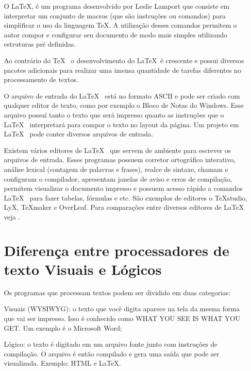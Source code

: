 O \LaTeX, é um programa desenvolvido por Leslie Lamport \cite{1994lamport} que consiste em interpretar um conjunto de macros (que são instruções ou comandos) para simplificar o uso da linguagem \TeX. A utilização desses comandos permitem o autor compor e configurar seu documento de modo mais simples utilizando estruturas pré definidas.

Ao contrário do \TeX~ o desenvolvimento do \LaTeX~é crescente e possui diversos pacotes adicionais para realizar uma imensa quantidade de tarefas diferentes no processamento de textos.

O arquivo de entrada do \LaTeX~ está no formato ASCII e pode ser criado com qualquer editor de texto, como por exemplo o Bloco de Notas do Windows. Esse arquivo possuí tanto o texto que será impresso quanto as instruções que o \LaTeX~ interpretará para compor o texto no layout da página. Um projeto em \LaTeX~ pode conter diversos arquivos de entrada.

Existem vários editores de \LaTeX~ que servem de ambiente para escrever os arquivos de entrada. Esses programas possuem corretor ortográfico interativo, análise lexical (contagem de palavras e frases), realce de sintaxe, chamam e configuram o compilador, apresentam janelas de aviso e erros de compilação, permitem visualizar o documento impresso e possuem acesso rápido a comandos \LaTeX~ para fazer tabelas, fórmulas e etc. São exemplos de editores o TeXstudio, LyX, TeXmaker e OverLeaf. Para comparações entre diversos editores de \LaTeX~ veja .

\section{Diferença entre processadores de texto Visuais e Lógicos}

Os programas que processam textos podem ser dividido em duas categorias:

\begin{alineas}
	
	\item Visuais (WYSIWYG): o texto que você digita aparece na tela da mesma forma que vai ser impresso. Isso é conhecido como WHAT YOU SEE IS WHAT YOU GET. Um exemplo é o Microsoft Word; 

	\item Lógico: o texto é digitado em um arquivo fonte junto com instruções de compilação. O arquivo é então compilado e gera uma saída que pode ser visualizada. Exemplo: HTML e \LaTeX.
	
\end{alineas}


